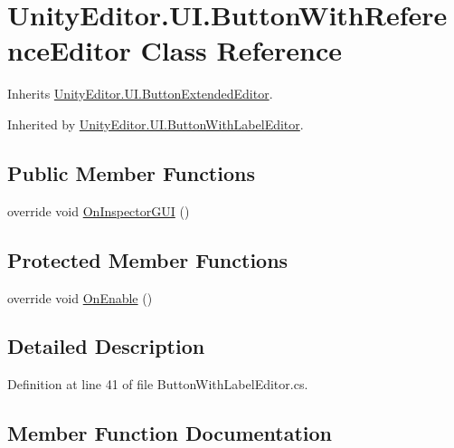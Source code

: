 \hypertarget{class_unity_editor_1_1_u_i_1_1_button_with_reference_editor}{}\section{Unity\+Editor.\+U\+I.\+Button\+With\+Reference\+Editor Class Reference}
\label{class_unity_editor_1_1_u_i_1_1_button_with_reference_editor}


Inherits \hyperlink{class_unity_editor_1_1_u_i_1_1_button_extended_editor}{Unity\+Editor.\+U\+I.\+Button\+Extended\+Editor}.



Inherited by \hyperlink{class_unity_editor_1_1_u_i_1_1_button_with_label_editor}{Unity\+Editor.\+U\+I.\+Button\+With\+Label\+Editor}.

\subsection*{Public Member Functions}
\begin{DoxyCompactItemize}
\item 
override void \hyperlink{class_unity_editor_1_1_u_i_1_1_button_with_reference_editor_a94e665c0708d7ffeb6dddf1c56edf53c}{On\+Inspector\+G\+U\+I} ()
\end{DoxyCompactItemize}
\subsection*{Protected Member Functions}
\begin{DoxyCompactItemize}
\item 
override void \hyperlink{class_unity_editor_1_1_u_i_1_1_button_with_reference_editor_acf3fe068bf55e7a1c0def5d3110570df}{On\+Enable} ()
\end{DoxyCompactItemize}


\subsection{Detailed Description}


Definition at line 41 of file Button\+With\+Label\+Editor.\+cs.



\subsection{Member Function Documentation}
\hypertarget{class_unity_editor_1_1_u_i_1_1_button_with_reference_editor_acf3fe068bf55e7a1c0def5d3110570df}{}

